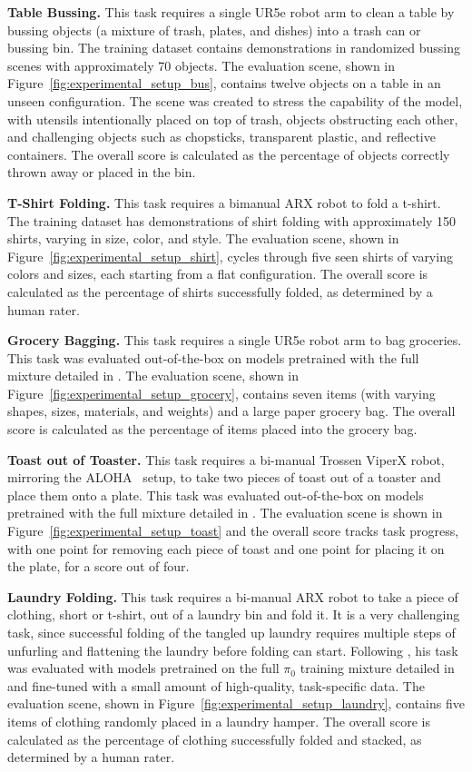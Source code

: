 \textbf{Table Bussing.} 
This task requires a single UR5e robot arm to clean a table by bussing objects (a mixture of trash, plates, and dishes) into a trash can or bussing bin. 
The training dataset contains demonstrations in randomized bussing scenes with approximately 70 objects. 
The evaluation scene, shown in Figure~\ref{fig:experimental_setup_bus}, contains twelve objects on a table in an unseen configuration.
The scene was created to stress the capability of the model, with utensils intentionally placed on top of trash, objects obstructing each other, and challenging objects such as chopsticks, transparent plastic, and reflective containers.
The overall score is calculated as the percentage of objects correctly thrown away or placed in the bin. 

\textbf{T-Shirt Folding.} 
This task requires a bimanual ARX robot to fold a t-shirt.
The training dataset has demonstrations of shirt folding with approximately 150 shirts, varying in size, color, and style.
The evaluation scene, shown in Figure~\ref{fig:experimental_setup_shirt}, cycles through five seen shirts of varying colors and sizes, each starting from a flat configuration.
The overall score is calculated as the percentage of shirts successfully folded, as determined by a human rater.

\textbf{Grocery Bagging.}
This task requires a single UR5e robot arm to bag groceries. 
This task was evaluated out-of-the-box on models pretrained with the full mixture detailed in \citet{black2024pi_0}.
The evaluation scene, shown in Figure~\ref{fig:experimental_setup_grocery}, contains seven items (with varying shapes, sizes, materials, and weights) and a large paper grocery bag. 
The overall score is calculated as the percentage of items placed into the grocery bag. 

\textbf{Toast out of Toaster.}
This task requires a bi-manual Trossen ViperX robot, mirroring the ALOHA~\cite{zhao2024alohaunleashedsimplerecipe} setup, to take two pieces of toast out of a toaster and place them onto a plate. 
This task was evaluated out-of-the-box on models pretrained with the full mixture detailed in \citet{black2024pi_0}.
The evaluation scene is shown in Figure~\ref{fig:experimental_setup_toast} and the overall score tracks task progress, with one point for removing each piece of toast and one point for placing it on the plate, for a score out of four. 

\textbf{Laundry Folding.}
This task requires a bi-manual ARX robot to take a piece of clothing, short or t-shirt, out of a laundry bin and fold it. It is a very challenging task, since successful folding of the tangled up laundry requires multiple steps of unfurling and flattening the laundry before folding can start.
Following \citet{black2024pi_0}, his task was evaluated with models pretrained on the full $\pi_0$ training mixture detailed in \citet{black2024pi_0} and fine-tuned with a small amount of high-quality, task-specific data.
The evaluation scene, shown in Figure~\ref{fig:experimental_setup_laundry}, contains five items of clothing randomly placed in a laundry hamper. 
The overall score is calculated as the percentage of clothing successfully folded and stacked, as determined by a human rater.


